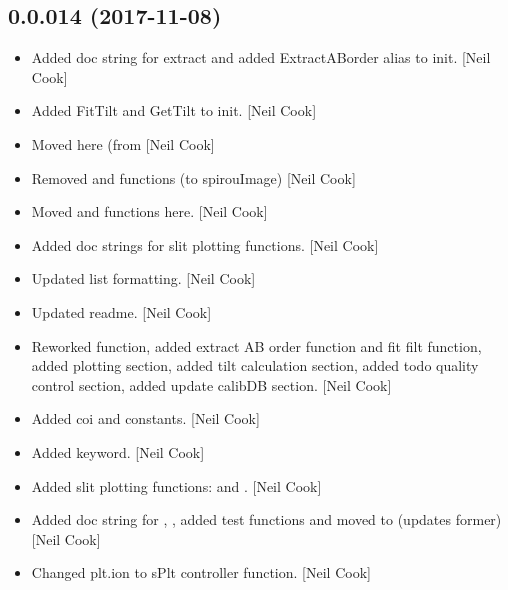 \documentclass[a4paper,10pt,english]{report}
\begin{document}
\subsection{0.0.014 (2017-11-08)}
\label{\detokenize{misc/changelog:id537}}\begin{itemize}
\item {} 
Added doc string for extract and added ExtractABorder alias to init.
{[}Neil Cook{]}

\item {} 
Added FitTilt and GetTilt to init. {[}Neil Cook{]}

\item {} 
Moved  here (from  {[}Neil Cook{]}

\item {} 
Removed  and  functions (to spirouImage) {[}Neil Cook{]}

\item {} 
Moved  and  functions here. {[}Neil Cook{]}

\item {} 
Added doc strings for slit plotting functions. {[}Neil Cook{]}

\item {} 
Updated  list formatting. {[}Neil Cook{]}

\item {} 
Updated readme. {[}Neil Cook{]}

\item {} 
Reworked  function, added extract AB order function and fit
filt function, added plotting section, added tilt calculation section,
added todo quality control section, added update calibDB section.
{[}Neil Cook{]}

\item {} 
Added coi  and  constants. {[}Neil Cook{]}

\item {} 
Added  keyword. {[}Neil Cook{]}

\item {} 
Added slit plotting functions:  and
. {[}Neil Cook{]}

\item {} 
Added doc string for , , added test
functions  and moved  to
 (updates former) {[}Neil Cook{]}

\item {} 
Changed plt.ion to sPlt controller function. {[}Neil Cook{]}

\end{itemize}
\end{document}
